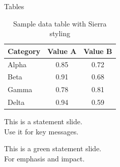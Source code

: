 \documentclass[aspectratio=169]{beamer}
\begin{document}

\begin{frame}{Tables}
  
  \begin{table}
    \centering
    \begin{tabular}{lcc}
      \toprule
      \textbf{Category} & \textbf{Value A} & \textbf{Value B} \\
      \midrule
      Alpha & 0.85 & 0.72 \\
      Beta & 0.91 & 0.68 \\
      Gamma & 0.78 & 0.81 \\
      Delta & 0.94 & 0.59 \\
      \bottomrule
    \end{tabular}
    \caption{Sample data table with Sierra styling}
  \end{table}
  
\end{frame}


{
\begin{frame}[plain]
  \centering
  \vfill
  {\fontsize{24}{30}\selectfont\interlight\textcolor{SierraCharcoal}{%
    This is a statement slide.\\[0.5em]
    Use it for key messages.%
  }}
  \vfill
\end{frame}
}


{
\begin{frame}[plain]
  \centering
  \vfill
  {\fontsize{24}{30}\selectfont\interlight\textcolor{SierraWhite}{%
    This is a green statement slide.\\[0.5em]
    For emphasis and impact.%
  }}
  \vfill
\end{frame}
}

\end{document}
